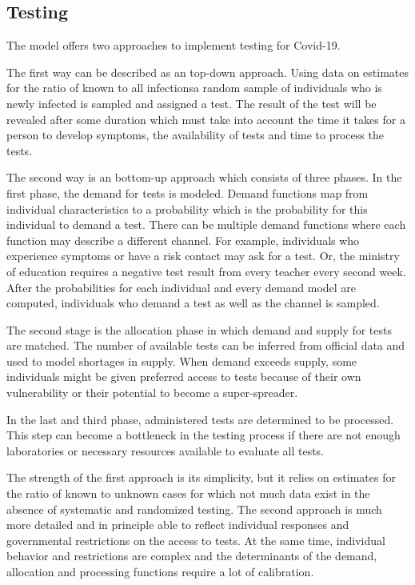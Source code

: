 \subsection{Testing} %
\label{sub:testing}

The model offers two approaches to implement testing for Covid-19.

The first way can be described as an top-down approach. Using data on estimates for the
ratio of known to all infections\footnotemark a random sample of individuals who is
newly infected is sampled and assigned a test. The result of the test will be revealed
after some duration which must take into account the time it takes for a person to
develop symptoms, the availability of tests and time to process the tests.


The second way is an bottom-up approach which consists of three phases. In the first
phase, the demand for tests is modeled. Demand functions map from individual
characteristics to a probability which is the probability for this individual to demand
a test. There can be multiple demand functions where each function may describe a
different channel. For example, individuals who experience symptoms or have a risk
contact may ask for a test. Or, the ministry of education requires a negative test
result from every teacher every second week. After the probabilities for each individual
and every demand model are computed, individuals who demand a test as well as the
channel is sampled.

The second stage is the allocation phase in which demand and supply for tests are
matched. The number of available tests can be inferred from official data and used to
model shortages in supply. When demand exceeds supply, some individuals might be given
preferred access to tests because of their own vulnerability or their potential to
become a super-spreader.

In the last and third phase, administered tests are determined to be processed. This
step can become a bottleneck in the testing process if there are not enough laboratories
or necessary resources available to evaluate all tests.

The strength of the first approach is its simplicity, but it relies on estimates for the
ratio of known to unknown cases for which not much data exist in the absence of
systematic and randomized testing. The second approach is much more detailed and in
principle able to reflect individual responses and governmental restrictions on the
access to tests. At the same time, individual behavior and restrictions are complex and
the determinants of the demand, allocation and processing functions require a lot of
calibration.

